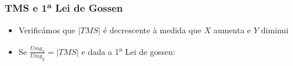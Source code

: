 \begin{frame}
	\frametitle{TMS e 1\textsuperscript{a} Lei de Gossen}
	\begin{itemize}
		\item Verific\'amos que $|TMS|$ \'e decrescente \`a medida que $X$ aumenta e $Y$ diminui
		\item<2-> Se $\frac{Umg_x}{Umg_y}=|TMS|$ e dada a 1\textsuperscript{a} Lei de gossen:
	\end{itemize}

\end{frame}

